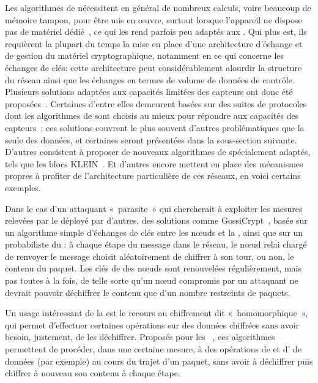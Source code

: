 Les algorithmes de  nécessitent en général de nombreux calculs, voire beaucoup de mémoire tampon, pour être mis en œuvre, surtout lorsque l'appareil ne dispose pas de matériel dédié~\cite{PLP06}, ce qui les rend parfois peu adaptés aux \rcs.
Qui plus est, ils requièrent la plupart du temps la mise en place d'une architecture d'échange et de gestion du matériel cryptographique, notamment en ce qui concerne les échanges de clés: cette architecture peut considérablement alourdir la structure du réseau ainsi que les échanges en termes de volume de données de contrôle.
Plusieurs solutions adaptées aux capacités limitées des capteurs ont donc été proposées~\cite{OX09}.
Certaines d'entre elles demeurent basées sur des suites de protocoles dont les algorithmes de  sont choisis au mieux pour répondre aux capacités des capteurs~\cite{SOBMCN11,KR12}; ces solutions couvrent le plus souvent d'autres problématiques que la seule  des données, et certaines seront présentées dans la sous-section suivante.
D'autres consistent à proposer de nouveaux algorithmes de  spécialement adaptés, tels que les blocs KLEIN~\cite{GNL12}.
Et d'autres encore mettent en place des mécanismes propres à profiter de l'architecture particulière de ces réseaux, en voici certains exemples.

Dans le cas d'un attaquant « parasite » qui chercherait à exploiter les mesures relevées par le \rc déployé par d'autres, des solutions comme GossiCrypt~\cite{LPH08}, basée sur un algorithme simple d'échanges de clés entre les nœuds et la \sdb, ainsi que sur un  probabiliste du : à chaque étape du message dans le réseau, le nœud relai chargé de renvoyer le message choisit aléatoirement de chiffrer à son tour, ou non, le contenu du paquet.
Les clés de  des nœuds sont renouvelées régulièrement, mais pas toutes à la fois, de telle sorte qu'un nœud compromis par un attaquant ne devrait pouvoir déchiffrer le contenu que d'un nombre restreints de paquets.

Un usage intéressant de la  est le recours au chiffrement dit « homomorphique », qui permet d'effectuer certaines opérations sur des données chiffrées sans avoir besoin, justement, de les déchiffrer.
Proposés pour les \rcs~\cite{BBTY14}, ces algorithmes permettent de procéder, dans une certaine mesure, à des opérations de  et d' de données (par exemple) au cours du trajet d'un paquet, sans avoir à déchiffrer puis chiffrer à nouveau son contenu à chaque étape.


